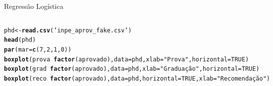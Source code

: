 \documentclass{beamer}\usepackage[]{graphicx}\usepackage[]{color}
\makeatletter
\newcommand{\hlnum}[1]{\textcolor[rgb]{0.686,0.059,0.569}{#1}}%
\newcommand{\hlstr}[1]{\textcolor[rgb]{0.192,0.494,0.8}{#1}}%
\newcommand{\hlopt}[1]{\textcolor[rgb]{0,0,0}{#1}}%
\newcommand{\hlstd}[1]{\textcolor[rgb]{0.345,0.345,0.345}{#1}}%
\newcommand{\hlkwb}[1]{\textcolor[rgb]{0.69,0.353,0.396}{#1}}%
\newcommand{\hlkwc}[1]{\textcolor[rgb]{0.333,0.667,0.333}{#1}}%
\newcommand{\hlkwd}[1]{\textcolor[rgb]{0.737,0.353,0.396}{\textbf{#1}}}%
\newenvironment{kframe}{%
 \def\at@end@of@kframe{}%
 \ifinner\ifhmode%
  \def\at@end@of@kframe{\end{minipage}}%
  \begin{minipage}{\columnwidth}%
 \fi\fi%
 \def\FrameCommand##1{\hskip\@totalleftmargin \hskip-\fboxsep
 \colorbox{shadecolor}{##1}\hskip-\fboxsep
     \hskip-\linewidth \hskip-\@totalleftmargin \hskip\columnwidth}%
 \MakeFramed {\advance\hsize-\width
   \@totalleftmargin\z@ \linewidth\hsize
   \@setminipage}}%
 {\par\unskip\endMakeFramed%
 \at@end@of@kframe}
\newenvironment{knitrout}{}{} %
\renewenvironment{knitrout}{\setlength{\topsep}{0mm}}{}
\makeatother
\begin{document}
\begin{frame}[fragile]{Regressão Logística}

\begin{columns}

\setlength{\topsep}{2pt}
\begin{knitrout}\tiny
{}\color{fgcolor}\begin{kframe}
\begin{alltt}
\hlstd{phd} \hlkwb{<-} \hlkwd{read.csv}\hlstd{(}\hlstr{'inpe_aprov_fake.csv'}\hlstd{)}
\hlkwd{head}\hlstd{(phd)}
\hlkwd{par}\hlstd{(}\hlkwc{mar}\hlstd{=}\hlkwd{c}\hlstd{(}\hlnum{7}\hlstd{,}\hlnum{2}\hlstd{,}\hlnum{1}\hlstd{,}\hlnum{0}\hlstd{))}
\hlkwd{boxplot}\hlstd{(prova} \hlopt{~} \hlkwd{factor}\hlstd{(aprovado),} \hlkwc{data}\hlstd{=phd,}\hlkwc{xlab}\hlstd{=}\hlstr{"Prova"}\hlstd{,}\hlkwc{horizontal}\hlstd{=}\hlnum{TRUE}\hlstd{)}
\hlkwd{boxplot}\hlstd{(grad} \hlopt{~}\hlkwd{factor}\hlstd{(aprovado),} \hlkwc{data}\hlstd{=phd,}\hlkwc{xlab}\hlstd{=}\hlstr{"Graduação"}\hlstd{,} \hlkwc{horizontal}\hlstd{=}\hlnum{TRUE}\hlstd{)}
\hlkwd{boxplot}\hlstd{(reco} \hlopt{~} \hlkwd{factor}\hlstd{(aprovado),} \hlkwc{data}\hlstd{=phd,}\hlkwc{horizontal}\hlstd{=}\hlnum{TRUE}\hlstd{,}\hlkwc{xlab}\hlstd{=}\hlstr{"Recomendação"}\hlstd{)}
\end{alltt}
\end{kframe}
\end{knitrout}

\begin{knitrout}
\color{fgcolor}
\includegraphics[width=0.6\linewidth]{figure/logplot2-1} 

\includegraphics[width=0.6\linewidth]{figure/logplot2-2} 


\end{knitrout}
\end{columns}
\end{frame}
\end{document}
